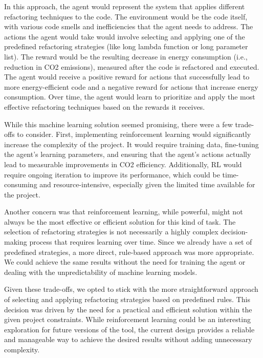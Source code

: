 \documentclass[12pt, titlepage]{article}
\begin{document}
\begin{enumerate}
  In this approach, the agent would represent the system that applies 
  different refactoring techniques to the code. The environment would 
  be the code itself, with various code smells and inefficiencies that 
  the agent needs to address. The actions the agent would take would 
  involve selecting and applying one of the predefined refactoring 
  strategies (like long lambda function or long parameter list). The reward 
  would be the resulting decrease in energy consumption (i.e., reduction 
  in CO2 emissions), measured after the code is refactored and executed. 
  The agent would receive a positive reward for actions that successfully 
  lead to more energy-efficient code and a negative reward for actions 
  that increase energy consumption. Over time, the agent would learn to 
  prioritize and apply the most effective refactoring techniques based 
  on the rewards it receives.


  While this machine learning solution seemed promising, there were a 
  few trade-offs to consider. First, implementing reinforcement 
  learning would significantly increase the complexity of the project. 
  It would require training data, fine-tuning the agent's learning parameters, 
  and ensuring that the agent's actions actually lead to measurable 
  improvements in CO2 efficiency. Additionally, RL would require 
  ongoing iteration to improve its performance, which could be time-consuming 
  and resource-intensive, especially given the limited time available 
  for the project.


  Another concern was that reinforcement learning, while powerful, 
  might not always be the most effective or efficient solution for 
  this kind of task. The selection of refactoring strategies is not 
  necessarily a highly complex decision-making process that requires 
  learning over time. Since we already have a set of predefined 
  strategies, a more direct, rule-based approach was more appropriate. 
  We could achieve the same results without the need for training the 
  agent or dealing with the unpredictability of machine learning models.


  Given these trade-offs, we opted to stick with the more straightforward 
  approach of selecting and applying refactoring strategies based on 
  predefined rules. This decision was driven by the need for a practical 
  and efficient solution within the given project constraints. While 
  reinforcement learning could be an interesting exploration for future 
  versions of the tool, the current design provides a reliable and 
  manageable way to achieve the desired results without adding 
  unnecessary complexity.


\end{enumerate}
\end{document}
